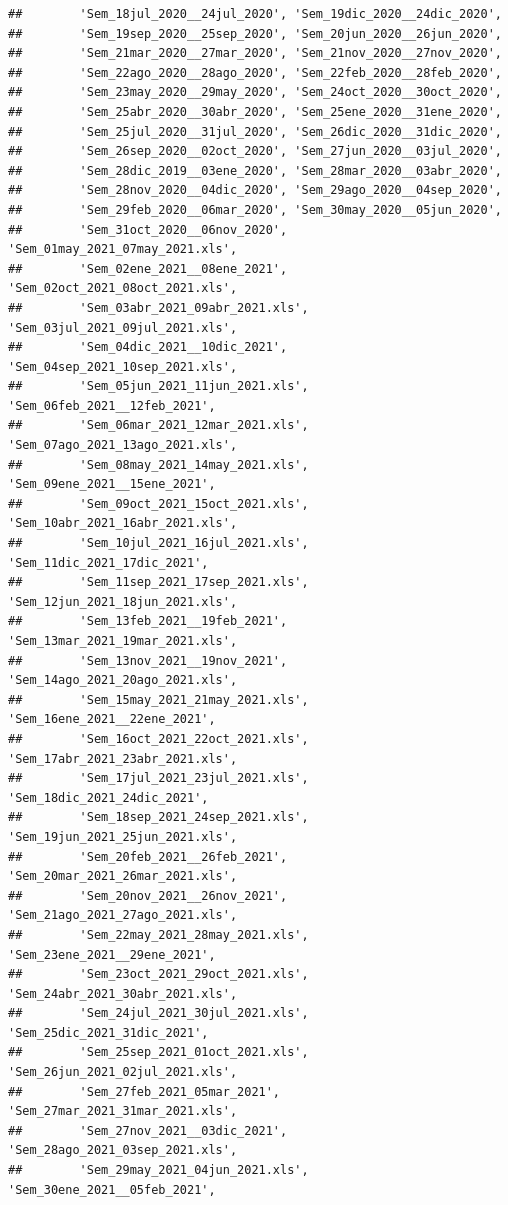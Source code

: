 \documentclass[
]{book}
\begin{document}
\begin{verbatim}
##        'Sem_18jul_2020__24jul_2020', 'Sem_19dic_2020__24dic_2020',
##        'Sem_19sep_2020__25sep_2020', 'Sem_20jun_2020__26jun_2020',
##        'Sem_21mar_2020__27mar_2020', 'Sem_21nov_2020__27nov_2020',
##        'Sem_22ago_2020__28ago_2020', 'Sem_22feb_2020__28feb_2020',
##        'Sem_23may_2020__29may_2020', 'Sem_24oct_2020__30oct_2020',
##        'Sem_25abr_2020__30abr_2020', 'Sem_25ene_2020__31ene_2020',
##        'Sem_25jul_2020__31jul_2020', 'Sem_26dic_2020__31dic_2020',
##        'Sem_26sep_2020__02oct_2020', 'Sem_27jun_2020__03jul_2020',
##        'Sem_28dic_2019__03ene_2020', 'Sem_28mar_2020__03abr_2020',
##        'Sem_28nov_2020__04dic_2020', 'Sem_29ago_2020__04sep_2020',
##        'Sem_29feb_2020__06mar_2020', 'Sem_30may_2020__05jun_2020',
##        'Sem_31oct_2020__06nov_2020', 'Sem_01may_2021_07may_2021.xls',
##        'Sem_02ene_2021__08ene_2021', 'Sem_02oct_2021_08oct_2021.xls',
##        'Sem_03abr_2021_09abr_2021.xls', 'Sem_03jul_2021_09jul_2021.xls',
##        'Sem_04dic_2021__10dic_2021', 'Sem_04sep_2021_10sep_2021.xls',
##        'Sem_05jun_2021_11jun_2021.xls', 'Sem_06feb_2021__12feb_2021',
##        'Sem_06mar_2021_12mar_2021.xls', 'Sem_07ago_2021_13ago_2021.xls',
##        'Sem_08may_2021_14may_2021.xls', 'Sem_09ene_2021__15ene_2021',
##        'Sem_09oct_2021_15oct_2021.xls', 'Sem_10abr_2021_16abr_2021.xls',
##        'Sem_10jul_2021_16jul_2021.xls', 'Sem_11dic_2021_17dic_2021',
##        'Sem_11sep_2021_17sep_2021.xls', 'Sem_12jun_2021_18jun_2021.xls',
##        'Sem_13feb_2021__19feb_2021', 'Sem_13mar_2021_19mar_2021.xls',
##        'Sem_13nov_2021__19nov_2021', 'Sem_14ago_2021_20ago_2021.xls',
##        'Sem_15may_2021_21may_2021.xls', 'Sem_16ene_2021__22ene_2021',
##        'Sem_16oct_2021_22oct_2021.xls', 'Sem_17abr_2021_23abr_2021.xls',
##        'Sem_17jul_2021_23jul_2021.xls', 'Sem_18dic_2021_24dic_2021',
##        'Sem_18sep_2021_24sep_2021.xls', 'Sem_19jun_2021_25jun_2021.xls',
##        'Sem_20feb_2021__26feb_2021', 'Sem_20mar_2021_26mar_2021.xls',
##        'Sem_20nov_2021__26nov_2021', 'Sem_21ago_2021_27ago_2021.xls',
##        'Sem_22may_2021_28may_2021.xls', 'Sem_23ene_2021__29ene_2021',
##        'Sem_23oct_2021_29oct_2021.xls', 'Sem_24abr_2021_30abr_2021.xls',
##        'Sem_24jul_2021_30jul_2021.xls', 'Sem_25dic_2021_31dic_2021',
##        'Sem_25sep_2021_01oct_2021.xls', 'Sem_26jun_2021_02jul_2021.xls',
##        'Sem_27feb_2021_05mar_2021', 'Sem_27mar_2021_31mar_2021.xls',
##        'Sem_27nov_2021__03dic_2021', 'Sem_28ago_2021_03sep_2021.xls',
##        'Sem_29may_2021_04jun_2021.xls', 'Sem_30ene_2021__05feb_2021',

\end{verbatim}
\end{document}
